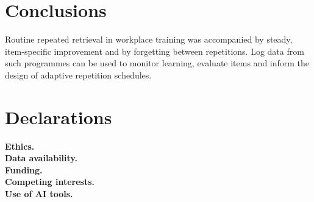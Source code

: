 \section{Conclusions}
Routine repeated retrieval in workplace training was accompanied by steady, item-specific
improvement and by forgetting between repetitions. Log data from such programmes can be used to
monitor learning, evaluate items and inform the design of adaptive repetition schedules.

\section*{Declarations}
\noindent\textbf{Ethics.} \\
\textbf{Data availability.} \\
\textbf{Funding.} \\
\textbf{Competing interests.} \\
\textbf{Use of AI tools.} 
